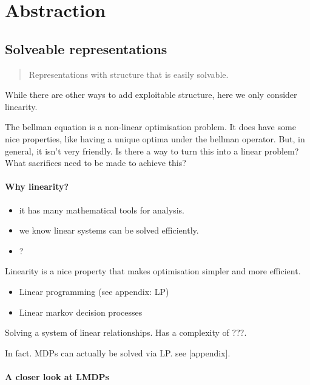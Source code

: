 \chapter{Abstraction}\label{C:bin}


\hypertarget{solveable-representations}{%
\section{Solveable representations}\label{solveable-representations}}

\begin{quote}
Representations with structure that is easily solvable.
\end{quote}

While there are other ways to add exploitable structure, here we only
consider linearity.

The bellman equation is a non-linear optimisation problem. It does have
some nice properties, like having a unique optima under the bellman
operator. But, in general, it isn't very friendly. Is there a way to
turn this into a linear problem? What sacrifices need to be made to
achieve this?

\hypertarget{why-linearity}{%
\subsubsection{Why linearity?}\label{why-linearity}}

\begin{itemize}
\tightlist
\item
  it has many mathematical tools for analysis.
\item
  we know linear systems can be solved efficiently.
\item
  ?
\end{itemize}

Linearity is a nice property that makes optimisation simpler and more
efficient.

\begin{itemize}
\tightlist
\item
  Linear programming (see appendix: LP)
\item
  Linear markov decision processes
\end{itemize}

Solving a system of linear relationships. Has a complexity of ???.

In fact. MDPs can actually be solved via LP. see {[}appendix{]}.

\hypertarget{a-closer-look-at-lmdps}{%
\subsubsection{A closer look at LMDPs}\label{a-closer-look-at-lmdps}}


